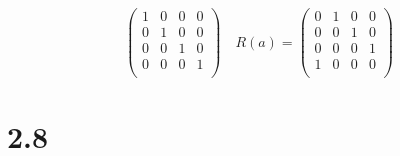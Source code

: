 \documentclass{article}
\begin{document}
\begin{CJK*}{GBK}{song}
\begin{equation}
\begin{pmatrix}
     1  &  0  &  0  &  0\\
     0  &  1  &  0  &  0\\
     0  &  0  &  1  &  0\\
     0  &  0  &  0  &  1\\
\end{pmatrix}\quad
R(a)=
\begin{pmatrix}
     0  &  1  &  0  &  0\\
     0  &  0  &  1  &  0\\
     0  &  0  &  0  &  1\\
     1  &  0  &  0  &  0\\
\end{pmatrix}
\end{equation}





\section{2.8}


































\end{CJK*}
\end{document}
